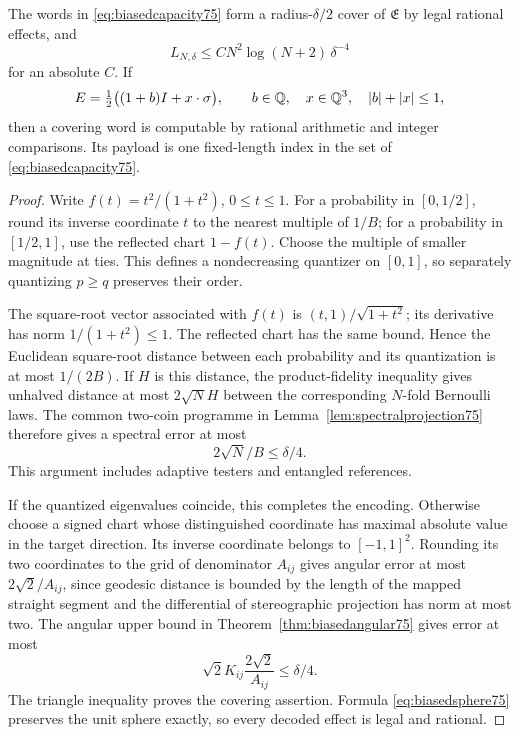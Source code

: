 \begin{theorem}\label{thm:biasedcodec75}
The words in \eqref{eq:biasedcapacity75} form a radius-$\delta/2$
cover of $\mathfrak E$ by legal rational effects, and
\begin{equation}\label{eq:biasedcapacitybound75}
 L_{N,\delta}\le C N^2\log(N+2)\,\delta^{-4}
\end{equation}
for an absolute $C$. If
\[
 E=\tfrac12\bigl((1+b)I+x\cdot\sigma\bigr),\qquad
 b\in\mathbb Q,\quad x\in\mathbb Q^3,\quad |b|+|x|\le1,
\]
then a covering word is computable by rational arithmetic and integer
comparisons. Its payload is one fixed-length index in the set of
\eqref{eq:biasedcapacity75}.
\end{theorem}
\begin{proof}
Write $f(t)=t^2/(1+t^2)$, $0\le t\le1$. For a probability in
$[0,1/2]$, round its inverse coordinate $t$ to the nearest multiple
of $1/B$; for a probability in $[1/2,1]$, use the reflected chart
$1-f(t)$. Choose the multiple of smaller magnitude at ties. This
defines a nondecreasing quantizer on $[0,1]$, so separately quantizing
$p\ge q$ preserves their order.

The square-root vector associated with $f(t)$ is
$(t,1)/\sqrt{1+t^2}$; its derivative has norm $1/(1+t^2)\le1$.
The reflected chart has the same bound. Hence the Euclidean
square-root distance between each probability and its quantization
is at most $1/(2B)$. If $H$ is this distance, the product-fidelity
inequality gives unhalved distance at most $2\sqrt N H$ between the
corresponding $N$-fold Bernoulli laws. The common two-coin programme
in Lemma~\ref{lem:spectralprojection75} therefore gives a spectral error
at most
\[
                         2\sqrt N/B\le\delta/4.
\]
This argument includes adaptive testers and entangled references.

If the quantized eigenvalues coincide, this completes the encoding.
Otherwise choose a signed chart whose distinguished coordinate has
maximal absolute value in the target direction. Its inverse coordinate
belongs to $[-1,1]^2$. Rounding its two coordinates to the grid of
denominator $A_{ij}$ gives angular error at most $2\sqrt2/A_{ij}$,
since geodesic distance is bounded by the length of the mapped
straight segment and the differential of stereographic projection has
norm at most two. The angular upper bound in Theorem~\ref{thm:biasedangular75}
gives error at most
\[
 \sqrt2 K_{ij}\frac{2\sqrt2}{A_{ij}}
                   \le\delta/4.
\]
The triangle inequality proves the covering assertion. Formula
\eqref{eq:biasedsphere75} preserves the unit sphere exactly, so every
decoded effect is legal and rational.


\end{proof}
